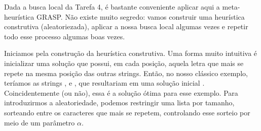 Dada a busca local da Tarefa 4, é bastante conveniente aplicar aqui a meta-heurística GRASP. Não existe muito segredo: vamos construir uma heurística construtiva (aleatoriezada), aplicar a nossa busca local algumas vezes e repetir todo esse processo algumas boas vezes.

Iniciamos pela construção da heurística construtiva. Uma forma muito intuitiva é inicializar uma solução que possui, em cada posição, aquela letra que mais se repete na mesma posição das outras strings. Então, no nosso clássico exemplo, teríamos as strings
,  e ,
que resultariam em uma solução inicial . Coincidentemente (ou não), essa é a solução ótima para esse exemplo.
Para introduzirmos a aleatoriedade, podemos restringir uma lista por tamanho, sorteando entre os caracteres que mais se repetem, controlando esse sorteio por meio de um parâmetro $\alpha$.
